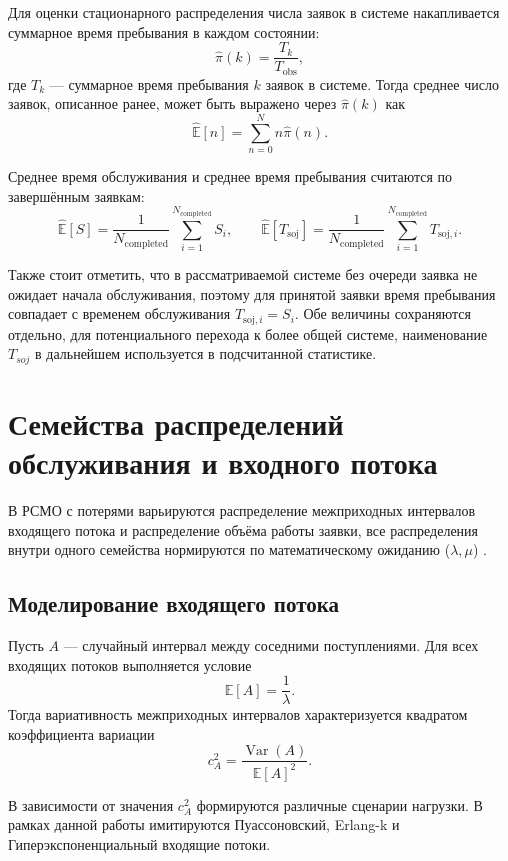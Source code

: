 Для оценки стационарного распределения числа заявок в системе накапливается суммарное время пребывания в каждом состоянии:
$$
\widehat{\pi}(k)
=
\frac{T_k}{T_{\mathrm{obs}}},
$$
где $T_k$ --- суммарное время пребывания $k$ заявок в системе. Тогда среднее число заявок, описанное ранее, может быть выражено через $\widehat{\pi}(k)$ как
$$
\widehat{\mathbb{E}}[n]
=
\sum_{n=0}^{N} n\widehat{\pi}(n).
$$

Среднее время обслуживания и среднее время пребывания считаются по завершённым заявкам:
$$
\widehat{\mathbb{E}}[S]
=
\frac{1}{N_{\mathrm{completed}}}
\sum_{i=1}^{N_{\mathrm{completed}}} S_i,
\qquad
\widehat{\mathbb{E}}[T_{\mathrm{soj}}]
=
\frac{1}{N_{\mathrm{completed}}}
\sum_{i=1}^{N_{\mathrm{completed}}} T_{\mathrm{soj},i}.
$$

Также стоит отметить, что в рассматриваемой системе без очереди заявка не ожидает начала обслуживания, поэтому для принятой заявки время пребывания совпадает с временем обслуживания $T_{\mathrm{soj},i}=S_i$. 
Обе величины сохраняются отдельно, для потенциального перехода к более общей системе, наименование $T_{soj}$ в дальнейшем используется в подсчитанной статистике. 

\section{Семейства распределений обслуживания и входного потока}
\label{sec:distributions}

В РСМО с потерями варьируются распределение межприходных интервалов входящего потока и распределение объёма работы заявки, все распределения внутри одного семейства нормируются по математическому ожиданию ($\lambda, \mu$) \cite{law2015_simulation_modeling}. 

\subsection{Моделирование входящего потока}
\label{subsec:arrival_process}

Пусть $A$ --- случайный интервал между соседними поступлениями. Для всех входящих потоков выполняется условие
$$    
\mathbb{E}[A]=\frac{1}{\lambda}.
$$
Тогда вариативность межприходных интервалов характеризуется квадратом коэффициента вариации
$$
c_A^2=\frac{\operatorname{Var}(A)}{\mathbb{E}[A]^2}.
$$

В зависимости от значения $c_A^2$ формируются различные сценарии нагрузки. В рамках данной работы имитируются Пуассоновский, Erlang-k и Гиперэкспоненциальный входящие потоки. 


